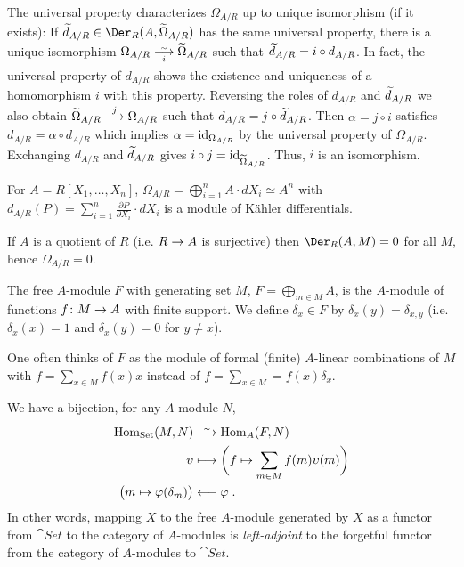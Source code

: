 \documentclass[a4paper,parskip=half,numbers=enddot, DIV=12]{scrreprt}
\begin{document}
\begin{rem*}
    \begin{alphanumerate}
        \item 
            The universal property characterizes $\Omega_{A/R}$ up to unique isomorphism (if it exists): If $\snake d_{A/R} \in\Der_R(A,\snake \Omega_{A/R})$ has the same universal property, there is a unique isomorphism $\Omega_{A/R}\isomorphism[i] \snake \Omega_{A/R}$ such that $\snake d _{A/R} = i \circ d_{A/R}$. In fact, the universal property of $d_{A/R}$ shows the existence and uniqueness of a homomorphism $i$ with this property. Reversing the roles of $d_{A/R}$ and $\snake d_{A/R}$ we also obtain $\snake\Omega_{A/R} \morphism[j]\Omega_{A/R}$ such that $d_{A/R} = j\circ \snake d_{A/R}$. Then $\alpha = j\circ i$ satisfies $d_{A/R} = \alpha\circ d_{A/R}$ which implies $\alpha= \operatorname{id}_{\Omega_{A/R}}$ by the universal property of $\Omega_{A/R}$. Exchanging $d_{A/R}$ and $\snake d_{A/R}$ gives $i \circ j = \id_{\snake\Omega_{A/R}}$. Thus, $i$ is an isomorphism.
        \item
            For $A= R[X_1,\ldots,X_n]$, $\Omega_{A/R} = \bigoplus_{i=1}^n A\cdot dX_i \simeq A^n$ with $d_{A/R} (P) = \sum_{i=1}^n \frac{\partial P }{\partial X_i} \cdot dX_i$ is a module of Kähler differentials.
        \item 
            If $A$ is a quotient of $R$ (i.e. $R\morphism A$ is surjective) then $\Der_R(A,M) = 0$ for all $M$, hence $\Omega_{A/R} = 0$.
    \end{alphanumerate}
\end{rem*}
\begin{defi} 
    The free $A$-module $F$ with generating set $M$, $F=\bigoplus_{m\in M}A$, is the $A$-module of functions $f\colon M \morphism A$ with finite support. We define $\delta_x \in F$ by $\delta_x(y) = \delta_{x,y}$ (i.e. $\delta_x(x)=1$ and $\delta_x(y)=0$ for $y\not=x$).
\end{defi}

\begin{rem*}
    \begin{alphanumerate}
        \item  
            One often thinks of $F$ as the module of formal (finite) $A$-linear combinations of $M$ with $f=\sum_{x\in M} f(x) x$ instead of $f= \sum_{x\in M} = f(x)\delta_x$.
        \item 
            We have a bijection, for any $A$-module $N$,
            \begin{align*}
                \Hom_{\cat{Set}}(M,N) &\isomorphism \Hom_A(F,N)\\
                \upsilon &\longmapsto \bigg(f\mapsto \sum_{m\in M} f(m) \upsilon(m)\bigg)\\
                \big(m\mapsto \phi(\delta_m) \big) &\longmapsfrom \phi\;.
            \end{align*}
            In other words, mapping $X$ to the free $A$-module generated by $X$ as a functor from $\cat{Set}$ to the category of $A$-modules is \emph{left-adjoint} to the forgetful functor from the category of $A$-modules to $\cat{Set}$.
    \end{alphanumerate}
\end{rem*}
\end{document}
